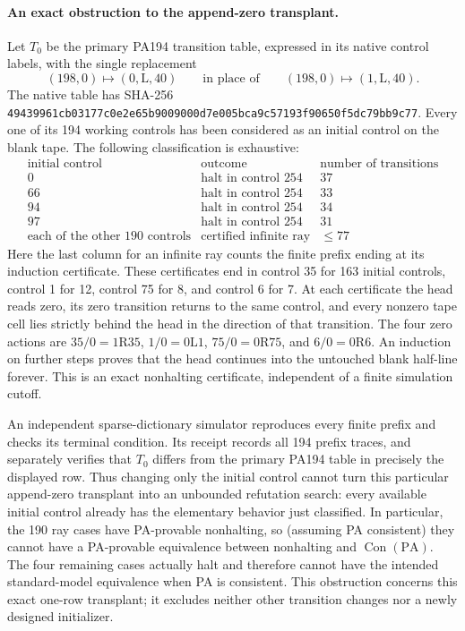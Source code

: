 \paragraph{An exact obstruction to the append-zero transplant.}
Let $T_0$ be the primary PA194 transition table, expressed in its native
control labels, with the single replacement
\[
 (198,0)\mapsto(0,\mathrm L,40)
 \qquad\text{in place of}\qquad
 (198,0)\mapsto(1,\mathrm L,40).
\]
The native table has SHA-256
\texttt{49439961cb03177c0e2e65b9009000d7e005bca9c57193f90650f5dc79bb9c77}.
Every one of its 194 working controls has been considered as an initial
control on the blank tape.  The following classification is exhaustive:
\[
\begin{array}{c|c|c}
\text{initial control}&\text{outcome}&\text{number of transitions}\\\hline
0&\text{halt in control }254&37\\
66&\text{halt in control }254&33\\
94&\text{halt in control }254&34\\
97&\text{halt in control }254&31\\
\text{each of the other 190 controls}&\text{certified infinite ray}&\leq77
\end{array}
\]
Here the last column for an infinite ray counts the finite prefix ending
at its induction certificate.  These certificates end in control 35 for
163 initial controls, control 1 for 12, control 75 for 8, and control 6 for
7.  At each certificate the head reads zero, its zero transition returns
to the same control, and every nonzero tape cell lies strictly behind
the head in the direction of that transition.  The four zero actions are
$35/0=1\mathrm R35$, $1/0=0\mathrm L1$, $75/0=0\mathrm R75$, and
$6/0=0\mathrm R6$.  An induction on further steps proves that the head
continues into the untouched blank half-line forever.  This is an exact
nonhalting certificate, independent of a finite simulation cutoff.

An independent sparse-dictionary simulator reproduces every finite
prefix and checks its terminal condition.  Its receipt records all 194
prefix traces, and separately verifies that $T_0$ differs from the
primary PA194 table in precisely the displayed row.  Thus changing only
the initial control cannot turn this particular append-zero transplant
into an unbounded refutation search: every available initial control
already has the elementary behavior just classified.  In particular,
the 190 ray cases have PA-provable nonhalting, so (assuming PA consistent)
they cannot have a PA-provable equivalence between nonhalting and
$\operatorname{Con}(\mathrm{PA})$.  The four remaining cases actually
halt and therefore cannot have the intended standard-model equivalence
when PA is consistent.  This obstruction concerns this exact one-row
transplant; it excludes neither other transition changes nor a newly
designed initializer.
